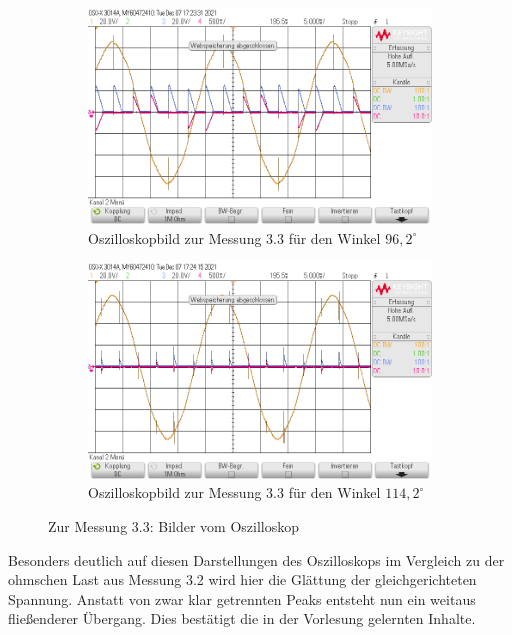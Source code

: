 \documentclass{article}
\begin{document}
\begin{figure}[h]
  \centering
  \begin{subfigure}{.45\textwidth}
    \centering
    \includegraphics[width=\linewidth]{../assets/images/GEP2/32_Winkel962.png}
    \caption{Oszilloskopbild zur Messung 3.3 für den Winkel $96,2^{\circ}$}
  \end{subfigure}
  \begin{subfigure}{.45\textwidth}
    \centering
    \includegraphics[width=\linewidth]{../assets/images/GEP2/32_Winkel1142.png}
    \caption{Oszilloskopbild zur Messung 3.3 für den Winkel $114,2^{\circ}$}
  \end{subfigure}
  \label{fig:31_242}
  \caption{Zur Messung 3.3: Bilder vom Oszilloskop}
\end{figure}
Besonders deutlich auf diesen Darstellungen des Oszilloskops im Vergleich zu der ohmschen Last aus Messung 3.2 wird hier die Glättung der gleichgerichteten Spannung. Anstatt von zwar klar getrennten Peaks entsteht nun ein weitaus fließenderer Übergang. Dies bestätigt die in der Vorlesung gelernten Inhalte.
\newpage
\end{document}
